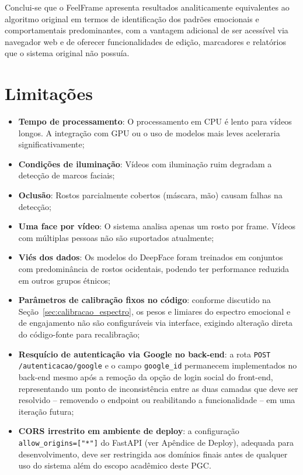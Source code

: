 \documentclass[
	12pt,
	openright,
	oneside,
	a4paper,
	english,
	brazil
	]{abntex2}
\begin{document}
Conclui-se que o FeelFrame apresenta resultados analiticamente equivalentes ao algoritmo original em termos de identificação dos padrões emocionais e comportamentais predominantes, com a vantagem adicional de ser acessível via navegador web e de oferecer funcionalidades de edição, marcadores e relatórios que o sistema original não possuía.

\section{Limitações}
\label{sec:limitacoes}

\begin{itemize}
    \item \textbf{Tempo de processamento}: O processamento em CPU é lento para vídeos longos. A integração com GPU ou o uso de modelos mais leves aceleraria significativamente;
    \item \textbf{Condições de iluminação}: Vídeos com iluminação ruim degradam a detecção de marcos faciais;
    \item \textbf{Oclusão}: Rostos parcialmente cobertos (máscara, mão) causam falhas na detecção;
    \item \textbf{Uma face por vídeo}: O sistema analisa apenas um rosto por frame. Vídeos com múltiplas pessoas não são suportados atualmente;
    \item \textbf{Viés dos dados}: Os modelos do DeepFace foram treinados em conjuntos com predominância de rostos ocidentais, podendo ter performance reduzida em outros grupos étnicos;
    \item \textbf{Parâmetros de calibração fixos no código}: conforme discutido na Seção~\ref{sec:calibracao_espectro}, os pesos e limiares do espectro emocional e de engajamento não são configuráveis via interface, exigindo alteração direta do código-fonte para recalibração;
    \item \textbf{Resquício de autenticação via Google no back-end}: a rota \texttt{POST /autenticacao/google} e o campo \texttt{google\_id} permanecem implementados no back-end mesmo após a remoção da opção de login social do front-end, representando um ponto de inconsistência entre as duas camadas que deve ser resolvido -- removendo o endpoint ou reabilitando a funcionalidade -- em uma iteração futura;
    \item \textbf{CORS irrestrito em ambiente de deploy}: a configuração \texttt{allow\_origins=["*"]} do FastAPI (ver Apêndice de Deploy), adequada para desenvolvimento, deve ser restringida aos domínios finais antes de qualquer uso do sistema além do escopo acadêmico deste PGC.
\end{itemize}
\end{document}
